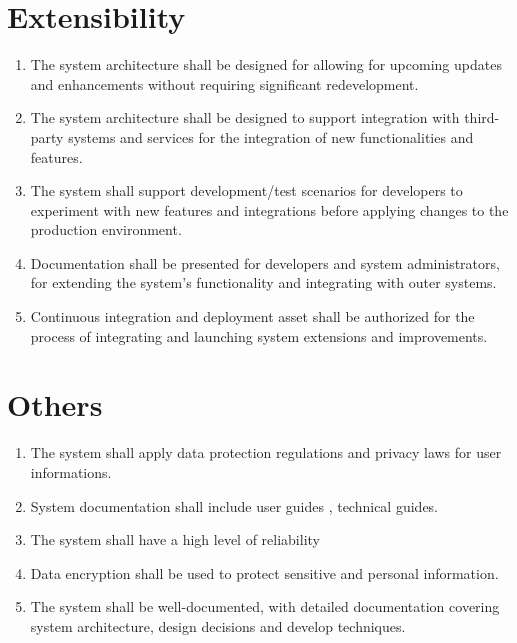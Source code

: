 \documentclass[a4paper,12pt]{report}
\begin{document}
	\section{Extensibility}
	\begin{enumerate}
		\item The system architecture shall be designed for allowing for upcoming updates and enhancements without requiring significant redevelopment.
		
		\item The system architecture shall be designed to support integration with third-party systems and services for the integration of new 
		functionalities and features.
		
		\item The system shall support  development/test scenarios for developers to experiment with new features and integrations before applying changes to the production environment.
		
		\item Documentation shall be presented for developers and system administrators,  for extending the system's functionality and integrating with outer systems.
		
		\item Continuous integration and deployment asset shall be authorized for the process of integrating and launching system extensions and improvements.
	\end{enumerate}
	\section{Others}
	\begin{enumerate}
		\item The system shall apply data protection regulations and privacy laws for user informations. 
		
		\item System documentation shall include user guides , technical guides. 
		
		\item The system shall have a high level of reliability
		
		\item Data encryption shall be used to protect sensitive and personal information.
		
		\item The system shall be well-documented, with detailed documentation covering system architecture, design decisions and develop techniques.
		
	\end{enumerate}
	
\end{document}
